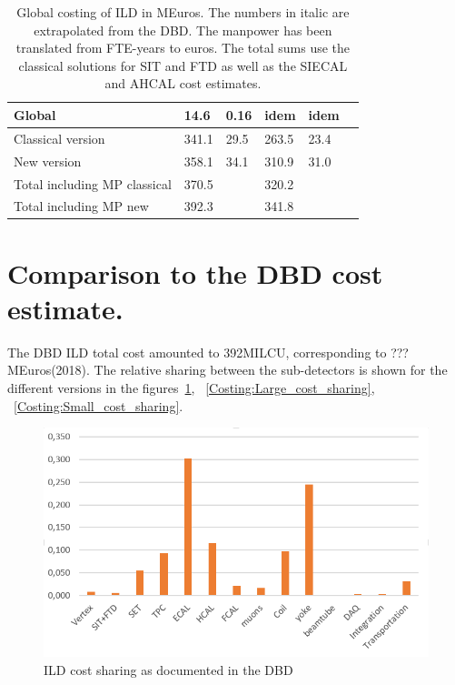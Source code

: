 \begin{table}[h!]
\begin{tabular}{ l p{0.15\hsize}p{0.15\hsize}p{0.15\hsize} p{0.15\hsize}p{0.15\hsize}}
Global        &14.6 &0.16& idem& idem\\
\midrule
Classical version & 341.1   &  29.5  & 263.5 & 23.4  \\
New version       & 358.1   &  34.1  & 310.9 & 31.0  \\
\midrule
Total including MP classical     & 370.5   &    & 320.2 &   \\
Total including MP new     & 392.3   &    & 341.8 &   \\
 \bottomrule
\end{tabular}
\caption{\label{cost_summary}Global costing of ILD in MEuros. The numbers in italic are extrapolated from the DBD. The manpower has been translated from FTE-years to euros. The total sums use the classical solutions for SIT and FTD as well as the SIECAL and AHCAL cost estimates. 
}
\end{table}

\section{Comparison to the DBD cost estimate.}
 The DBD ILD total cost amounted to 392MILCU, corresponding to ??? MEuros(2018). The relative sharing between the sub-detectors is shown for the different versions in the figures~\ref{fig:det:DBD_cost_sharing}, ~\ref{Costing:Large_cost_sharing}, ~\ref{Costing:Small_cost_sharing}. 
 
\begin{figure}[h!]
\centering
\includegraphics[width=0.8\hsize]{Detector/fig/DBD_cost_sharing.PNG}
\caption{ILD cost sharing as documented in the DBD}
\label{fig:det:DBD_cost_sharing}
\end{figure}


